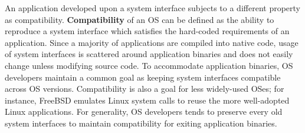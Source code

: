 



An application developed upon a system interface subjects to a different property as compatibility.
{\bf Compatibility} of an OS can be
defined as 
the ability to reproduce a system interface which satisfies the hard-coded requirements of an application.
Since a majority of applications are compiled into native code,
usage of system interfaces
is scattered around application binaries
and does not easily change unless modifying source code.
To accommodate application binaries,
OS developers maintain a common goal as keeping system interfaces
compatible across OS versions.
Compatibility is also a goal for less widely-used OSes; for instance, FreeBSD emulates Linux system calls to
reuse the more well-adopted Linux applications.
For generality, OS developers tends to preserve every old system interfaces
to maintain compatibility for exiting application binaries.

